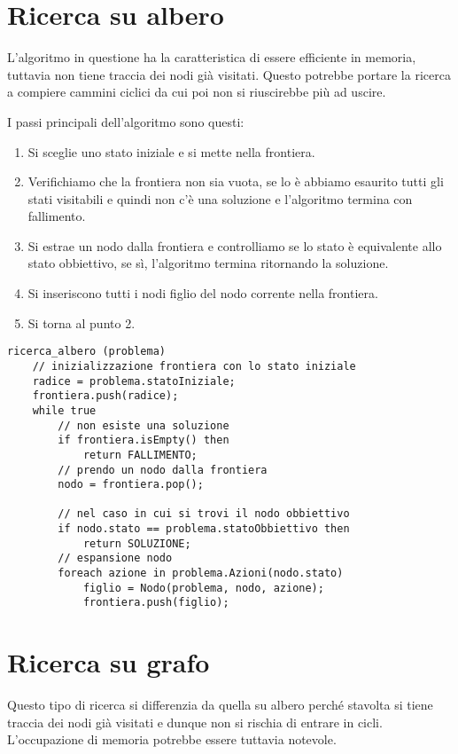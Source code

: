 \section{Ricerca su albero}
L'algoritmo in questione ha la caratteristica di essere efficiente in memoria, tuttavia
non tiene traccia dei nodi gi\`a visitati. Questo potrebbe portare la ricerca a compiere
cammini ciclici da cui poi non si riuscirebbe pi\`u ad uscire.

I passi principali dell'algoritmo sono questi:
\begin{enumerate}
	\item Si sceglie uno stato iniziale e si mette nella frontiera.
	\item Verifichiamo che la frontiera non sia vuota, se lo \`e abbiamo esaurito tutti gli
	      stati visitabili e quindi non c'\`e una soluzione e l'algoritmo termina con
	      fallimento.
	\item Si estrae un nodo dalla frontiera e controlliamo se lo stato \`e equivalente allo
	      stato obbiettivo, se s\`i, l'algoritmo termina ritornando la soluzione.
	\item Si inseriscono tutti i nodi figlio del nodo corrente nella frontiera.
	\item Si torna al punto 2.
\end{enumerate}
\begin{lstlisting}[style=pseudo-style]
ricerca_albero (problema)
	// inizializzazione frontiera con lo stato iniziale
	radice = problema.statoIniziale;
	frontiera.push(radice);
	while true
		// non esiste una soluzione
		if frontiera.isEmpty() then
			return FALLIMENTO;
		// prendo un nodo dalla frontiera
		nodo = frontiera.pop();
		
		// nel caso in cui si trovi il nodo obbiettivo
		if nodo.stato == problema.statoObbiettivo then
			return SOLUZIONE;
		// espansione nodo
		foreach azione in problema.Azioni(nodo.stato)
			figlio = Nodo(problema, nodo, azione);
			frontiera.push(figlio);
\end{lstlisting}

\section{Ricerca su grafo}
Questo tipo di ricerca si differenzia da quella su albero perch\'e stavolta si tiene traccia
dei nodi gi\`a visitati e dunque non si rischia di entrare in cicli. L'occupazione di memoria
potrebbe essere tuttavia notevole.

